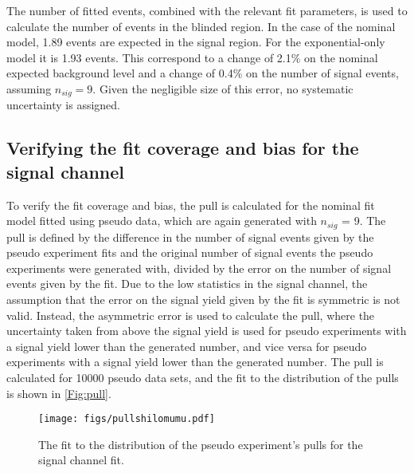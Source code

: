 The number of fitted events, combined with the relevant fit parameters, is used to calculate the number of events in the blinded region. In the case of the nominal model, 1.89 events are expected in the signal region. For the exponential-only model it is 1.93 events. This correspond to a change of 2.1\% on the nominal expected background level and a change of 0.4\% on the number of signal events, assuming $n_{sig} = 9$. Given the negligible size of this error, no systematic uncertainty is assigned. 



\subsection{Verifying the fit coverage and bias for the signal channel}
\label{sec:pull}
To verify the fit coverage and bias, the pull is calculated for the nominal fit model fitted using pseudo data, which are again generated with $n_{sig}$ = 9. The pull is defined by the difference in the number of signal events given by the pseudo experiment fits and the original number of signal events the pseudo experiments were generated with, divided by the error on the number of signal events given by the fit. Due to the low statistics in the signal channel, the assumption that the error on the signal yield given by the fit is symmetric is not valid. Instead, the asymmetric error is used to calculate the pull, where the uncertainty taken from above the signal yield is used for pseudo experiments with a signal yield lower than the generated number, and vice versa for pseudo experiments with a signal yield lower than the generated number. The pull is calculated for 10000 pseudo data sets, and the fit to the distribution of the pulls is shown in \autoref{Fig:pull}.
\begin{figure}[h!]
  \def\nh{0.7\textwidth}
  \centering
  \texttt{[image: figs/pullshilomumu.pdf]}%
  \caption{The fit to the distribution of the pseudo experiment's pulls for the signal channel fit. }%
  \label{Fig:pull}
\end{figure}


